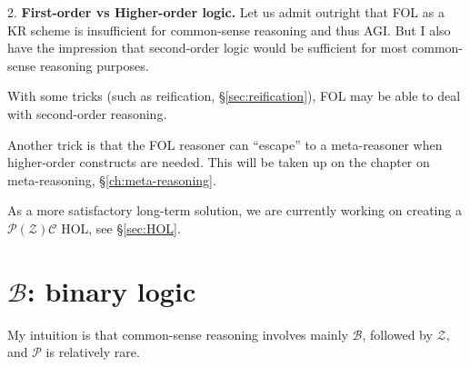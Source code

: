 2.  \textbf{First-order vs Higher-order logic.}  Let us admit outright that FOL as a KR scheme is insufficient for common-sense reasoning and thus AGI.  But I also have the impression that second-order logic would be sufficient for most common-sense reasoning purposes.

With some tricks (such as reification, \S\ref{sec:reification}), FOL may be able to deal with second-order reasoning.

Another trick is that the FOL reasoner can ``escape'' to a meta-reasoner when higher-order constructs are needed.  This will be taken up on the chapter on meta-reasoning, \S\ref{ch:meta-reasoning}.

As a more satisfactory long-term solution, we are currently working on creating a $\mathcal{P(Z)C}$ HOL, see \S\ref{sec:HOL}.


\section{$\mathcal{B}$: binary logic}
\label{sec:binary-logic}

My intuition is that common-sense reasoning involves mainly $\mathcal{B}$, followed by $\mathcal{Z}$, and $\mathcal{P}$ is relatively rare.





